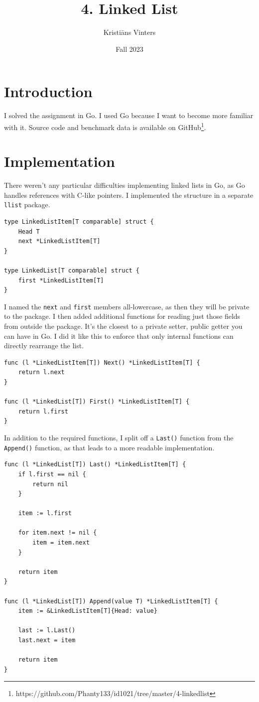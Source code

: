 \documentclass[a4paper,11pt]{article}
\title{\textbf{4. Linked List}}
\author{Kristiāns Vinters}
\date{Fall 2023}
\begin{document}
    \maketitle
    \section*{Introduction}

    I solved the assignment in Go. I used Go because I want to become more familiar with it. Source code and benchmark data is available on GitHub\footnote[1]{https://github.com/Phanty133/id1021/tree/master/4-linkedlist}.

    \section*{Implementation}

    There weren't any particular difficulties implementing linked lists in Go, as Go handles references with C-like pointers. I implemented the structure in a separate \texttt{llist} package.

    \begin{verbatim}
type LinkedListItem[T comparable] struct {
    Head T
    next *LinkedListItem[T]
}

type LinkedList[T comparable] struct {
    first *LinkedListItem[T]
}
    \end{verbatim}

    I named the \texttt{next} and \texttt{first} members all-lowercase, as then they will be private to the package. I then added additional functions for reading just those fields from outside the package. It's the closest to a private setter, public getter you can have in Go. I did it like this to enforce that only internal functions can directly rearrange the list.

    \begin{verbatim}
func (l *LinkedListItem[T]) Next() *LinkedListItem[T] {
    return l.next
}

func (l *LinkedList[T]) First() *LinkedListItem[T] {
    return l.first
}
    \end{verbatim}

    In addition to the required functions, I split off a \texttt{Last()} function from the \texttt{Append()} function, as that leads to a more readable implementation.

    \begin{verbatim}
func (l *LinkedList[T]) Last() *LinkedListItem[T] {
    if l.first == nil {
        return nil
    }

    item := l.first

    for item.next != nil {
        item = item.next
    }

    return item
}

func (l *LinkedList[T]) Append(value T) *LinkedListItem[T] {
    item := &LinkedListItem[T]{Head: value}
    
    last := l.Last()
    last.next = item

    return item
}
    \end{verbatim}
\end{document}
